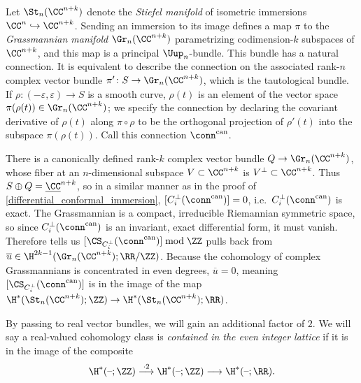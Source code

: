 \begin{example}
\label{cpx_stiefel}
Let $\St_n(\CC^{n+k})$ denote the \textit{Stiefel manifold} of isometric immersions
$\CC^n\hookrightarrow\CC^{n+k}$. Sending an immersion to its image defines a map $\pi$ to the \textit{Grassmannian
manifold} $\Gr_n(\CC^{n+k})$ parametrizing codimension-$k$ subspaces of $\CC^{n+k}$, and this map is a principal
$\Uup_n$-bundle.
This bundle has a natural connection. It is equivalent to describe the connection on the associated rank-$n$
complex vector bundle $\pi'\colon S\to\Gr_n(\CC^{n+k})$, which is the tautological bundle. If $\rho\colon
(-\varepsilon, \varepsilon)\to S$ is a smooth curve, $\rho(t)$ is an element of the vector space
$\pi(\rho(t))\in\Gr_n(\CC^{n+k})$; we specify the connection by declaring the covariant derivative of $\rho(t)$
along $\pi\circ\rho$ to be the orthogonal projection of $\rho'(t)$ into the subspace $\pi(\rho(t))$. Call this
connection $\conn^{\mathrm{can}}$.

There is a canonically defined rank-$k$ complex vector bundle $Q\to\Gr_n(\CC^{n+k})$, whose fiber at an
$n$-dimensional subspace $V\subset\CC^{n+k}$ is $V^\perp\subset\CC^{n+k}$. Thus $S\oplus Q = \underline\CC^{n+k}$,
so in a similar manner as in the proof of \cref{differential_conformal_immersion}, $[C_i^\perp(\conn^{\mathrm{can}})] = 0$, i.e.\ $C_i^\perp(\conn^{\mathrm{can}})$ is exact. The Grassmannian is a compact,
irreducible Riemannian symmetric space, so since $C_i^\perp(\conn^{\mathrm{can}})$ is an invariant, exact
differential form, it must vanish. Therefore  tells us
$[\CS_{C_i^\perp}(\conn^{\mathrm{can}})]\bmod\ZZ$ pulls back from $\overline u\in
\H^{2k-1}(\Gr_n(\CC^{n+k});\RR/\ZZ)$. Because the cohomology of complex Grassmannians is concentrated in even
degrees, $\overline u = 0$, meaning $[\CS_{C_i^\perp}(\conn^{\mathrm{can}})]$ is in the image of the map
$\H^*(\St_n(\CC^{n+k});\ZZ)\to\H^*(\St_n(\CC^{n+k});\RR)$.
\end{example}
By passing to real vector bundles, we will gain an additional factor of $2$.
We will say a real-valued cohomology
class is \textit{contained in the even integer lattice} if it is in the image of the composite
\begin{equation}
	\H^*(\text{--};\ZZ)\overset{\cdot 2}{\longrightarrow} \H^*(\text{--}; \ZZ)\longrightarrow\H^*(\text{--};\RR).
\end{equation}

